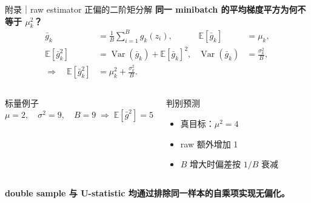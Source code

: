 \documentclass[aspectratio=169,10pt]{beamer}
\newcommand{\HL}[1]{\textcolor{emphasis}{#1}}
\newcommand{\keyline}[1]{\vfill\centering\HL{\textbf{#1}}}
\begin{document}
\begin{frame}{附录｜raw estimator 正偏的二阶矩分解}
  \textbf{同一 minibatch 的平均梯度平方为何不等于 $\mu_k^2$？}
  \begin{align*}
    \bar g_k &= \frac{1}{B}\sum_{i=1}^{B} g_k(z_i),
    &\mathbb E[\bar g_k]&=\mu_k,\\
    \mathbb E[\bar g_k^2]
      &=\operatorname{Var}(\bar g_k)+\mathbb E[\bar g_k]^2,
    &\operatorname{Var}(\bar g_k)&=\frac{\sigma_k^2}{B},\\
    \Rightarrow\quad
    \mathbb E[\bar g_k^2]&=\mu_k^2+\frac{\sigma_k^2}{B}.&&
  \end{align*}
  \begin{columns}[T]
      \begin{exampleblock}{标量例子}
        \[
          \mu=2,\quad \sigma^2=9,\quad B=9
          \;\Rightarrow\; \mathbb E[\bar g^2]=5
        \]
      \end{exampleblock}
      \begin{block}{判别预测}
        \begin{itemize}
          \item 真目标：$\mu^2=4$
          \item raw 额外增加 1
          \item $B$ 增大时偏差按 $1/B$ 衰减
        \end{itemize}
      \end{block}
  \end{columns}
  \keyline{double sample 与 U-statistic 均通过排除同一样本的自乘项实现无偏化。}
\end{frame}
\end{document}

